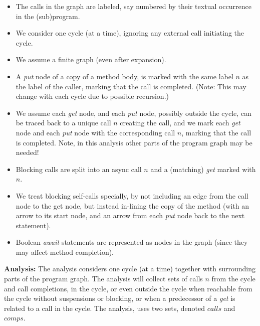\documentclass[12pt]{article}%
\begin{document}
\begin{itemize}
\item
The calls in the graph are labeled, 
say numbered by their textual occurrence in the (sub)program.
\item
 We consider one cycle (at a time),
ignoring any external call initiating the cycle.
\item
We assume a finite graph (even after expansion).
\item 
A  \emph{put} node of a copy of a method body, is marked with the same label $n$ as the label of the
caller, marking that the call is completed. (Note: This may change with each cycle due to possible recursion.)
\item
We assume each \emph{get}  node,
and each \emph{put} node, possibly outside the cycle, 
can be traced back to a unique call $n$ creating the call,
and we mark each  \emph{get} node and each  \emph{put} node  with the corresponding call  $n$, marking that the call is 
completed.
Note, in this analysis other parts of the program graph may be needed!
\item
Blocking calls are split into an async call $n$ and a (matching) \emph{get}
marked with  $n$.
\item
We treat blocking self-calls specially,
by not including an edge from the call node to the get node,
but instead  in-lining  the copy of the method
 (with an arrow to its
start node, and an arrow from each  \emph{put} node
back to the next statement).
\item
Boolean \emph{await} statements are represented as nodes in the graph
(since they may affect method completion).

\end{itemize}
\textbf{Analysis:}
The analysis considers one cycle (at a time)
together with surrounding parts of the program graph.
The analysis will collect sets of calls $n$ from the cycle and call completions,
in  the cycle, or even outside  the cycle when  reachable from the cycle without suspensions or blocking,
or  when a predecessor of  a \emph{get} is related to a call in the cycle.
The analysis, uses two sets, denoted $calls$ and $comps$.
\end{document}
